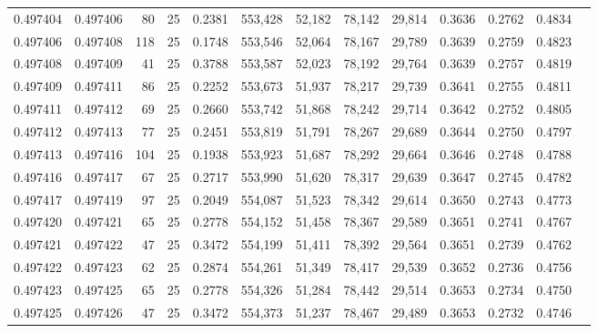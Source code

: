 \begin{tabular}{rrrrrrrrrrrrr}
0.497404 & 0.497406 &    80 &  25 &                                     0.2381 & 553,428 &  52,182 &  78,142 &  29,814 & 0.3636 & 0.2762 & 0.4834 \\
0.497406 & 0.497408 &   118 &  25 &                                     0.1748 & 553,546 &  52,064 &  78,167 &  29,789 & 0.3639 & 0.2759 & 0.4823 \\
0.497408 & 0.497409 &    41 &  25 &                                     0.3788 & 553,587 &  52,023 &  78,192 &  29,764 & 0.3639 & 0.2757 & 0.4819 \\
0.497409 & 0.497411 &    86 &  25 &                                     0.2252 & 553,673 &  51,937 &  78,217 &  29,739 & 0.3641 & 0.2755 & 0.4811 \\
0.497411 & 0.497412 &    69 &  25 &                                     0.2660 & 553,742 &  51,868 &  78,242 &  29,714 & 0.3642 & 0.2752 & 0.4805 \\
0.497412 & 0.497413 &    77 &  25 &                                     0.2451 & 553,819 &  51,791 &  78,267 &  29,689 & 0.3644 & 0.2750 & 0.4797 \\
0.497413 & 0.497416 &   104 &  25 &                                     0.1938 & 553,923 &  51,687 &  78,292 &  29,664 & 0.3646 & 0.2748 & 0.4788 \\
0.497416 & 0.497417 &    67 &  25 &                                     0.2717 & 553,990 &  51,620 &  78,317 &  29,639 & 0.3647 & 0.2745 & 0.4782 \\
0.497417 & 0.497419 &    97 &  25 &                                     0.2049 & 554,087 &  51,523 &  78,342 &  29,614 & 0.3650 & 0.2743 & 0.4773 \\
0.497420 & 0.497421 &    65 &  25 &                                     0.2778 & 554,152 &  51,458 &  78,367 &  29,589 & 0.3651 & 0.2741 & 0.4767 \\
0.497421 & 0.497422 &    47 &  25 &                                     0.3472 & 554,199 &  51,411 &  78,392 &  29,564 & 0.3651 & 0.2739 & 0.4762 \\
0.497422 & 0.497423 &    62 &  25 &                                     0.2874 & 554,261 &  51,349 &  78,417 &  29,539 & 0.3652 & 0.2736 & 0.4756 \\
0.497423 & 0.497425 &    65 &  25 &                                     0.2778 & 554,326 &  51,284 &  78,442 &  29,514 & 0.3653 & 0.2734 & 0.4750 \\
0.497425 & 0.497426 &    47 &  25 &                                     0.3472 & 554,373 &  51,237 &  78,467 &  29,489 & 0.3653 & 0.2732 & 0.4746 \\

\end{tabular}

